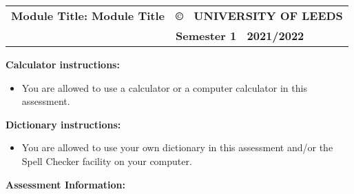 \documentclass[12pt]{article}
\def\semester{Semester 1}
\def\session{2021/2022}
\def\module{Module Title} %
\begin{document}
	
	\normalsize
	\vspace{3mm}
	
	{\renewcommand{\arraystretch}{1.5}
		\begin{tabular}[h]{p{9cm}p{7cm}}
			{\bf Module Title: \module}\vspace{2cm} %
			& {\bf \copyright ~ UNIVERSITY OF LEEDS} \\
			\noindent{\bf School of Physics and Astronomy} & {\bf \semester ~ \session}\\ 
		\end{tabular}
	}
	
	\vspace*{1cm}
	
	
\textbf{Calculator instructions:}
\begin{itemize}[itemsep=3pt,topsep=0pt]
\item You are allowed to use a calculator or a computer calculator in this assessment. 
\end{itemize}
\textbf{Dictionary instructions:}
\begin{itemize}[itemsep=3pt,topsep=0pt]
	\item You are allowed to use your own dictionary in this assessment and/or the Spell Checker facility on your computer. 
\end{itemize}
\textbf{Assessment Information:}
\end{document}
